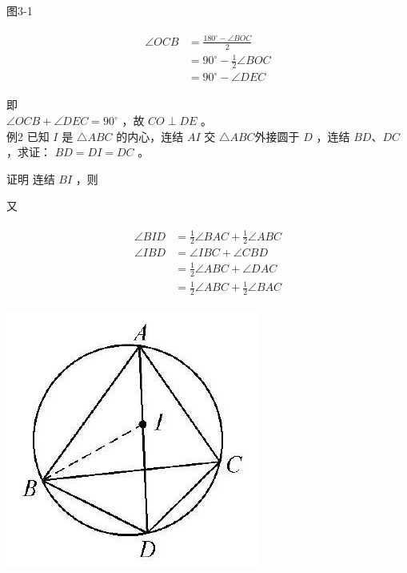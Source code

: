 \documentclass[10pt]{article}
\begin{document}
图3-1

\begin{align*}
\begin{aligned}
\angle O C B & =\frac{180^{\circ}-\angle B O C}{2} \\
& =90^{\circ}-\frac{1}{2} \angle B O C \\
& =90^{\circ}-\angle D E C
\end{aligned}
\end{align*}

即\\
$\angle O C B+\angle D E C=90^{\circ}$ ，故 $C O \perp D E$ 。\\
例2 已知 $I$ 是 $\triangle A B C$ 的内心，连结 $A I$ 交 $\triangle A B C$外接圆于 $D$ ，连结 $B D 、 D C$ ，求证： $B D=D I=D C$ 。

证明 连结 $B I$ ，则

又

\begin{align*}
\begin{aligned}
\angle B I D & =\frac{1}{2} \angle B A C+\frac{1}{2} \angle A B C \\
\angle I B D & =\angle I B C+\angle C B D \\
& =\frac{1}{2} \angle A B C+\angle D A C \\
& =\frac{1}{2} \angle A B C+\frac{1}{2} \angle B A C
\end{aligned}
\end{align*}

\begin{center}
\includegraphics[max width=\textwidth]{2024_10_30_66b8e5e701da2093c133g-023(1)}
\end{center}
\end{document}
